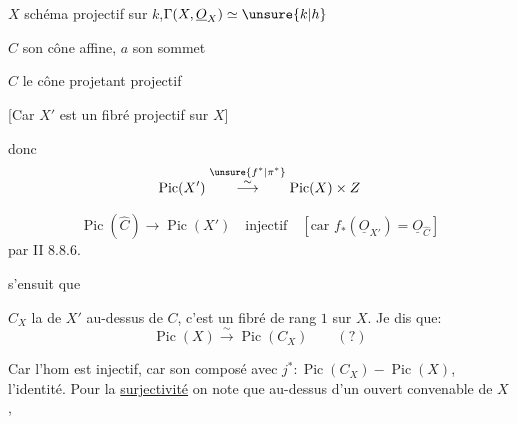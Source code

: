 
$X$ schéma projectif sur $k$,\qquad $\Gamma(X,\underline O_X)\simeq\unsure{k|h}$

$C$ son cône  affine, $a$ son sommet

$\hat C$ le cône projetant projectif


[Car $X'$ est un fibré projectif sur $X$]

donc
\[
\operatorname{Pic}(X')\overset{\unsure{f^*|\pi^*}}{\overset{\sim}{\longrightarrow}}\operatorname{Pic}(X)\times Z
\]

\[
\operatorname{Pic}(\hat C)\longrightarrow\operatorname{Pic}(X')
\quad\text{injectif}\quad[\text{car }f_*(\underline O_{X'})=\underline O_{\hat C}]
\]
par II 8.8.6.

 s'ensuit que

 $C_X$ la  de $X'$ au-dessus de $C$,
c'est un fibré  de rang $1$ sur $X$.
Je dis que:
\[
\operatorname{Pic}(X)\overset{\sim}{\longrightarrow}\operatorname{Pic}(C_X)\qquad(?)
\]


Car l'hom est  injectif, car son composé avec
$j^*:\operatorname{Pic}(C_X)\mathbin{-}\operatorname{Pic}(X)$,
 l'identité. Pour la \uline{surjectivité} on note que au-dessus
d'un ouvert convenable de $X$,

